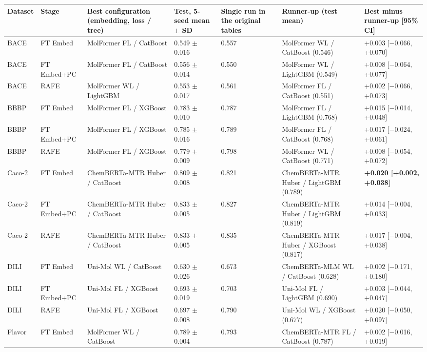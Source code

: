 \begin{tabular}{lllllll}
\toprule
Dataset & Stage & Best configuration (embedding, loss / tree) & Test, 5-seed mean $\pm$ SD & Single run in the original tables & Runner-up (test mean) & Best minus runner-up [95\% CI] \\
\midrule
BACE & FT Embed & MolFormer FL / CatBoost & 0.549 $\pm$ 0.016 & 0.557 & MolFormer WL / CatBoost (0.546) & +0.003 [$-$0.066, +0.070] \\
BACE & FT Embed+PC & MolFormer FL / CatBoost & 0.556 $\pm$ 0.014 & 0.550 & MolFormer WL / LightGBM (0.549) & +0.008 [$-$0.064, +0.077] \\
BACE & RAFE & MolFormer WL / LightGBM & 0.553 $\pm$ 0.017 & 0.561 & MolFormer FL / CatBoost (0.551) & +0.002 [$-$0.066, +0.073] \\
BBBP & FT Embed & MolFormer FL / XGBoost & 0.783 $\pm$ 0.010 & 0.787 & MolFormer FL / LightGBM (0.768) & +0.015 [$-$0.014, +0.048] \\
BBBP & FT Embed+PC & MolFormer FL / XGBoost & 0.785 $\pm$ 0.016 & 0.789 & MolFormer FL / CatBoost (0.768) & +0.017 [$-$0.024, +0.061] \\
BBBP & RAFE & MolFormer FL / XGBoost & 0.779 $\pm$ 0.009 & 0.798 & MolFormer WL / CatBoost (0.771) & +0.008 [$-$0.054, +0.072] \\
Caco-2 & FT Embed & ChemBERTa-MTR Huber / CatBoost & 0.809 $\pm$ 0.008 & 0.821 & ChemBERTa-MTR Huber / LightGBM (0.789) & \textbf{+0.020 [+0.002, +0.038]} \\
Caco-2 & FT Embed+PC & ChemBERTa-MTR Huber / CatBoost & 0.833 $\pm$ 0.005 & 0.827 & ChemBERTa-MTR Huber / LightGBM (0.819) & +0.014 [$-$0.004, +0.033] \\
Caco-2 & RAFE & ChemBERTa-MTR Huber / CatBoost & 0.833 $\pm$ 0.005 & 0.835 & ChemBERTa-MTR Huber / XGBoost (0.817) & +0.017 [$-$0.004, +0.038] \\
DILI & FT Embed & Uni-Mol WL / CatBoost & 0.630 $\pm$ 0.026 & 0.673 & ChemBERTa-MLM WL / CatBoost (0.628) & +0.002 [$-$0.171, +0.180] \\
DILI & FT Embed+PC & Uni-Mol FL / XGBoost & 0.693 $\pm$ 0.019 & 0.703 & Uni-Mol FL / LightGBM (0.690) & +0.003 [$-$0.044, +0.047] \\
DILI & RAFE & Uni-Mol FL / XGBoost & 0.697 $\pm$ 0.008 & 0.790 & Uni-Mol WL / XGBoost (0.677) & +0.020 [$-$0.050, +0.097] \\
Flavor & FT Embed & MolFormer WL / CatBoost & 0.789 $\pm$ 0.004 & 0.793 & ChemBERTa-MTR FL / CatBoost (0.787) & +0.002 [$-$0.016, +0.019] \\

\end{tabular}
